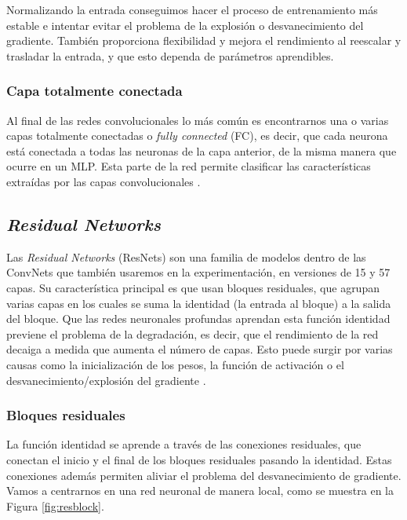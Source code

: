 Normalizando la entrada conseguimos hacer el proceso de entrenamiento más estable e intentar evitar el problema de la explosión o desvanecimiento del gradiente. También proporciona flexibilidad y mejora el rendimiento al reescalar y trasladar la entrada, y que esto dependa de parámetros aprendibles.

\subsubsection{Capa totalmente conectada}

Al final de las redes convolucionales lo más común es encontrarnos una o varias capas totalmente conectadas o \textit{fully connected} (FC), es decir, que cada neurona está conectada a todas las neuronas de la capa anterior, de la misma manera que ocurre en un MLP. Esta parte de la red permite clasificar las características extraídas por las capas convolucionales \cite{stanford_231}.

\subsection{\textit{Residual Networks}}
\label{sec:resnets}

Las \textit{Residual Networks} (ResNets) \cite{ResNets} son una familia de modelos dentro de las ConvNets que también usaremos en la experimentación, en versiones de 15 y 57 capas. Su característica principal es que usan bloques residuales, que agrupan varias capas en los cuales se suma la identidad (la entrada al bloque) a la salida del bloque. Que las redes neuronales profundas aprendan esta función identidad previene el problema de la degradación, es decir, que el rendimiento de la red decaiga a medida que aumenta el número de capas. Esto puede surgir por varias causas como la inicialización de los pesos, la función de activación o el desvanecimiento/explosión del gradiente \cite{divedeeplearning}. 

\subsubsection{Bloques residuales}

La función identidad se aprende a través de las conexiones residuales, que conectan el inicio y el final de los bloques residuales pasando la identidad. Estas conexiones además permiten aliviar el problema del desvanecimiento de gradiente. Vamos a centrarnos en una red neuronal de manera local, como se muestra en la Figura \ref{fig:resblock}. 

